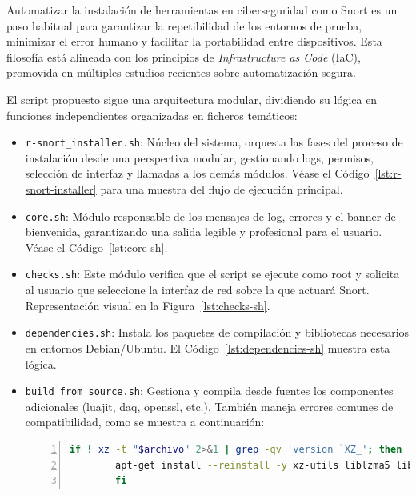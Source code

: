 \documentclass[11pt,a4paper,twoside]{report}
\begin{document}
Automatizar la instalación de herramientas en ciberseguridad como Snort es un paso habitual para garantizar la repetibilidad de los entornos de prueba, minimizar el error humano y facilitar la portabilidad entre dispositivos. Esta filosofía está alineada con los principios de \textit{Infrastructure as Code} (IaC), promovida en múltiples estudios recientes sobre automatización segura.
\newline

El script propuesto sigue una arquitectura modular, dividiendo su lógica en funciones independientes organizadas en ficheros temáticos:

\begin{itemize}
	\item \texttt{r-snort\_installer.sh}: Núcleo del sistema, orquesta las fases del proceso de instalación desde una perspectiva modular, gestionando logs, permisos, selección de interfaz y llamadas a los demás módulos.  
	Véase el Código~\ref{lst:r-snort-installer} para una muestra del flujo de ejecución principal.
	
	\item \texttt{core.sh}: Módulo responsable de los mensajes de log, errores y el banner de bienvenida, garantizando una salida legible y profesional para el usuario.  
	Véase el Código~\ref{lst:core-sh}.
	
	\item \texttt{checks.sh}: Este módulo verifica que el script se ejecute como root y solicita al usuario que seleccione la interfaz de red sobre la que actuará Snort.  
	Representación visual en la Figura~\ref{lst:checks-sh}.
	
	\item \texttt{dependencies.sh}: Instala los paquetes de compilación y bibliotecas necesarios en entornos Debian/Ubuntu.  
	El Código~\ref{lst:dependencies-sh} muestra esta lógica.
	
	\item \texttt{build\_from\_source.sh}: Gestiona y compila desde fuentes los componentes adicionales (luajit, daq, openssl, etc.).  
	También maneja errores comunes de compatibilidad, como se muestra a continuación:
	
	\begin{lstlisting}[language=bash, caption={Corrección de versiones incompatibles de xz/liblzma}, label=lst:xz, basicstyle=\ttfamily\footnotesize, frame=single, numbers=left, numberstyle=\tiny, breaklines=true]
		if ! xz -t "$archivo" 2>&1 | grep -qv 'version `XZ_'; then
		apt-get install --reinstall -y xz-utils liblzma5 liblzma-dev
		fi
	\end{lstlisting}
	

\end{itemize}
\end{document}
